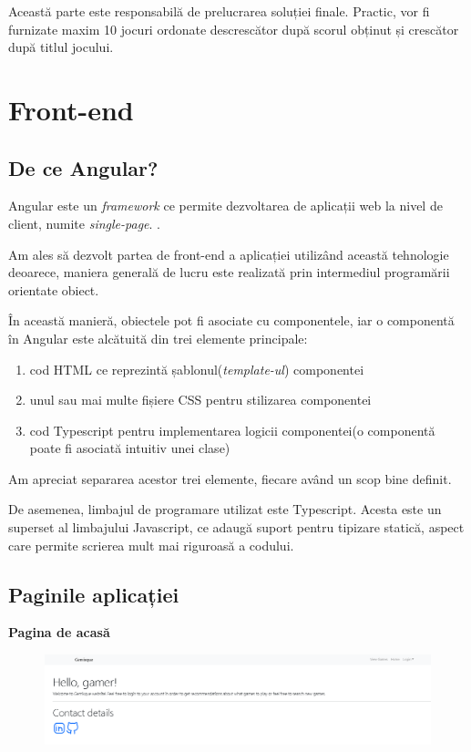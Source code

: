 \documentclass[12pt,a4paper]{report}
\begin{document}
Această parte este responsabilă de prelucrarea soluției finale. Practic, vor fi furnizate maxim 10 jocuri ordonate descrescător după scorul obținut și crescător după titlul jocului.

\section{Front-end}

\subsection{De ce Angular?}

Angular este un \emph{framework} ce permite dezvoltarea de aplicații web la nivel de client, numite \emph{single-page}. \cite{31}.

Am ales să dezvolt partea de front-end a aplicației utilizând această tehnologie deoarece, maniera generală de lucru este realizată prin intermediul programării orientate obiect.

În această manieră, obiectele pot fi asociate cu componentele, iar o componentă în Angular este alcătuită din trei elemente principale:

\begin{enumerate}
  \item cod HTML ce reprezintă șablonul(\emph{template-ul}) componentei
  \item unul sau mai multe fișiere CSS pentru stilizarea componentei
  \item cod Typescript pentru implementarea logicii componentei(o componentă poate fi asociată intuitiv unei clase) 
\end{enumerate}

Am apreciat separarea acestor trei elemente, fiecare având un scop bine definit.

De asemenea, limbajul de programare utilizat este Typescript. Acesta este un superset al limbajului Javascript, ce adaugă suport pentru tipizare statică, aspect care permite scrierea mult mai riguroasă a codului.

\subsection{Paginile aplicației}

\bigskip
\textbf{Pagina de acasă}
\bigskip

\begin{figure}[H]
\centering
\caption{}
\begin{adjustbox}{max size={\textwidth}{\textheight}}
\includegraphics{exemplu_30_home_page}
\end{adjustbox}

\caption*{}
\end{figure}
\end{document}
